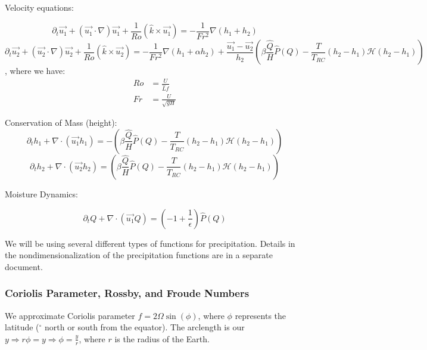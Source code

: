 \documentclass[10pt]{article}
\newcommand{\HH}{\mathcal{H}}
\begin{document}
Velocity equations:

\begin{equation}
\partial_{t} \vec{u_1} + (\vec{u_1}\cdot \nabla)\vec{u_1} + \frac{1}{Ro}(\hat{k}\times \vec{u_1}) = -\frac{1}{Fr^2}\nabla (h_1 +h_2)
\label{NDVel1}
\end{equation}
\begin{equation}
\partial_{t} \vec{u_2} + (\vec{u_2}\cdot \nabla)\vec{u_2} + \frac{1}{Ro}(\hat{k}\times \vec{u_2}) = -\frac{1}{Fr^2}\nabla (h_1 +\alpha h_2) +  \frac{\vec{u_1}-\vec{u_2}}{h_2}\left(\beta\frac{\hat{Q}}{H}\hat{P}(Q)-\frac{T}{T_{RC}}(h_2-h_1)\HH(h_2-h_1)\right)
\label{NDVel2}
\end{equation}
, where we have:
\begin{align*}
Ro &= \frac{U}{\hat{L}f} \\ 
Fr &= \frac{U}{\sqrt{gH}}
\end{align*}

Conservation of Mass (height):
\begin{equation}
\partial_{t}h_1 + \nabla \cdot (\vec{u_1}h_1) = -\left(\beta\frac{\hat{Q}}{H}\hat{P}(Q)-\frac{T}{T_{RC}}(h_2-h_1)\HH(h_2-h_1)\right)
\label{NDHei1}
\end{equation}
\begin{equation}
\partial_{t}h_2 + \nabla \cdot (\vec{u_2}h_2) = \left(\beta\frac{\hat{Q}}{H}\hat{P}(Q)-\frac{T}{T_{RC}}(h_2-h_1)\HH(h_2-h_1)\right)
\label{NDHei2}
\end{equation}

Moisture Dynamics:

\begin{equation}
\partial_{t} Q + \nabla \cdot (\vec{u_1}Q) = \left(-1+\frac{1}{\epsilon}\right) \hat{P}(Q)
\label{NDMoi}
\end{equation}

We will be using several different types of functions for precipitation. Details in the nondimensionalization of the precipitation functions are in a separate document.


\subsubsection{Coriolis Parameter, Rossby, and Froude Numbers}

We approximate Coriolis parameter $f= 2 \Omega \sin(\phi)$, where $\phi$ represents the latitude ($^{\circ}$ north or south from the equator). The arclength is our $y \Rightarrow r\phi = y \Rightarrow \phi = \frac{y}{r}$, where $r$ is the radius of the Earth. 
\end{document}
